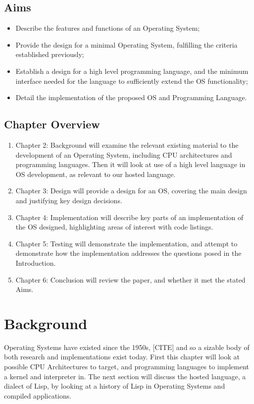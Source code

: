 \documentclass[11pt]{report}
\begin{document}
\section{Aims}
\begin{itemize}
\item Describe the features and functions of an Operating System;
\item Provide the design for a minimal Operating System, fulfilling the criteria established previously;
\item Establish a design for a high level programming language, and the minimum interface needed for the language to sufficiently extend the OS functionality;
\item Detail the implementation of the proposed OS and Programming Language.
\end{itemize}

\section{Chapter Overview}
\begin{enumerate}
\item Chapter 2: Background will examine the relevant existing material to the development of an Operating System, including CPU architectures and programming languages. Then it will look at use of a high level language in OS development, as relevant to our hosted language.
\item Chapter 3: Design will provide a design for an OS, covering the main design and justifying key design decisions.
\item Chapter 4: Implementation will describe key parts of an implementation of the OS designed, highlighting areas of interest with code listings.
\item Chapter 5: Testing will demonstrate the implementation, and attempt to demonstrate how the implementation addresses the questions posed in the Introduction.
\item Chapter 6: Conclusion will review the paper, and whether it met the stated Aims.
\end{enumerate}


\chapter{Background}

Operating Systems have existed since the 1950s, [CITE] and so a sizable body of both research and implementations exist today. First this chapter will look at possible CPU Architectures to target, and programming languages to implement a kernel and interpreter in. The next section will discuss the hosted language, a dialect of Lisp, by looking at a history of Lisp in Operating Systems and compiled applications.
\end{document}
